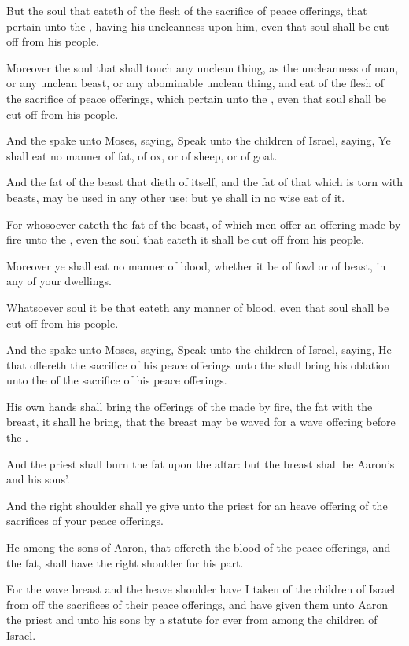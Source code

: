 \Verse But the soul that eateth of the flesh of the sacrifice of peace offerings, that pertain unto the \LORD, having his uncleanness upon him, even that soul shall be cut off from his people.

\Verse Moreover the soul that shall touch any unclean thing, as the uncleanness of man, or any unclean beast, or any abominable unclean thing, and eat of the flesh of the sacrifice of peace offerings, which pertain unto the \LORD, even that soul shall be cut off from his people.

\Verse And the \LORD spake unto Moses, saying, \Verse Speak unto the children of Israel, saying, Ye shall eat no manner of fat, of ox, or of sheep, or of goat.

\Verse And the fat of the beast that dieth of itself, and the fat of that which is torn with beasts, may be used in any other use: but ye shall in no wise eat of it.

\Verse For whosoever eateth the fat of the beast, of which men offer an offering made by fire unto the \LORD, even the soul that eateth it shall be cut off from his people.

\Verse Moreover ye shall eat no manner of blood, whether it be of fowl or of beast, in any of your dwellings.

\Verse Whatsoever soul it be that eateth any manner of blood, even that soul shall be cut off from his people.

\Verse And the \LORD spake unto Moses, saying, \Verse Speak unto the children of Israel, saying, He that offereth the sacrifice of his peace offerings unto the \LORD shall bring his oblation unto the \LORD of the sacrifice of his peace offerings.

\Verse His own hands shall bring the offerings of the \LORD made by fire, the fat with the breast, it shall he bring, that the breast may be waved for a wave offering before the \LORD.

\Verse And the priest shall burn the fat upon the altar: but the breast shall be Aaron's and his sons'.

\Verse And the right shoulder shall ye give unto the priest for an heave offering of the sacrifices of your peace offerings.

\Verse He among the sons of Aaron, that offereth the blood of the peace offerings, and the fat, shall have the right shoulder for his part.

\Verse For the wave breast and the heave shoulder have I taken of the children of Israel from off the sacrifices of their peace offerings, and have given them unto Aaron the priest and unto his sons by a statute for ever from among the children of Israel.

